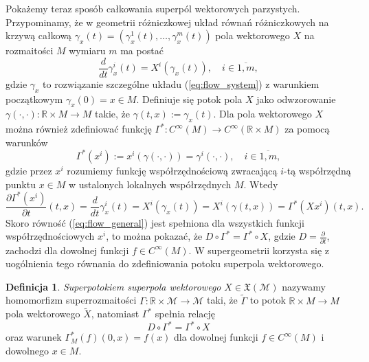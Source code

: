 \documentclass[11pt,a4paper]{report}
\theoremstyle{definition}
\newtheorem{definition}[theorem]{Definicja}
\begin{document}
Pokażemy teraz sposób całkowania superpól wektorowych parzystych. Przypominamy, że w geometrii różniczkowej układ równań różniczkowych na krzywą całkową $\gamma_x (t) = (\gamma_x ^1(t), \ldots, \gamma_x ^m (t))$ pola wektorowego $X$ na rozmaitości $M$ wymiaru $m$ ma postać
\begin{equation}
	\label{eq:flow_system}
	\frac{d}{dt}\gamma_{x}^i(t)=X^i(\gamma_{x}(t)), \quad i \in \overline{1,m},
\end{equation}
gdzie $\gamma_{x}$ to rozwiązanie szczególne układu (\ref{eq:flow_system}) z warunkiem początkowym $\gamma_x(0) = x \in M.$ Definiuje się potok pola $X$ jako odwzorowanie $\gamma(\cdot, \cdot): \mathbb{R} \times M \rightarrow M$ takie, że $\gamma(t, x) := \gamma_x (t).$ Dla pola wektorowego $X$ można również zdefiniować funkcję $\Gamma^* : C^\infty (M) \rightarrow C^\infty (\mathbb{R} \times M)$ za pomocą warunków
\begin{equation*}
	\Gamma^*(x^i) := x^i(\gamma(\cdot, \cdot)) =  \gamma^i(\cdot, \cdot), \quad i \in \overline{1,m},
\end{equation*}
gdzie przez $x^i$ rozumiemy funkcję współrzędnościową zwracającą $i$-tą współrzędną punktu $x\in M$ w ustalonych lokalnych współrzędnych $M$. Wtedy
\begin{equation}
	\label{eq:flow_general}
	\frac{\partial \Gamma^*(x^i)}{\partial t}(t, x) 
	= \frac{d}{dt} \gamma^i_x(t) = X^i(\gamma_x(t)) = X^i(\gamma(t,x))=\Gamma^*(Xx^i) (t,x). 
\end{equation}
Skoro równość (\ref{eq:flow_general}) jest spełniona dla wszystkich funkcji współrzędnościowych $x^i$, to można pokazać, że $D\circ \Gamma^*=\Gamma^*\circ X$, gdzie $D = \frac{\partial}{\partial t}$, zachodzi dla dowolnej funkcji $f \in C^\infty(M)$. W supergeometrii korzysta się z uogólnienia tego równania do zdefiniowania potoku superpola wektorowego.
		      			 
\begin{definition}
	\textit{Superpotokiem superpola wektorowego} $X \in \mathfrak{X}(\mathcal{M})$ nazywamy homomorfizm superrozmaitości $\Gamma : \mathbb{R} \times \mathcal{M} \rightarrow \mathcal{M}$ taki, że $\widetilde \Gamma$ to potok $\mathbb{R} \times M \rightarrow M$ pola wektorowego $\widetilde X$, natomiast $\Gamma^*$ spełnia relację
	\begin{equation*}
		D\circ \Gamma^*=\Gamma^*\circ X
	\end{equation*}
	oraz warunek $\Gamma^*_{M} (f )(0,x) = f(x)$ dla dowolnej funkcji $f \in C^\infty (M)$ i dowolnego $x \in M.$
\end{definition}
		      			 
\end{document}
